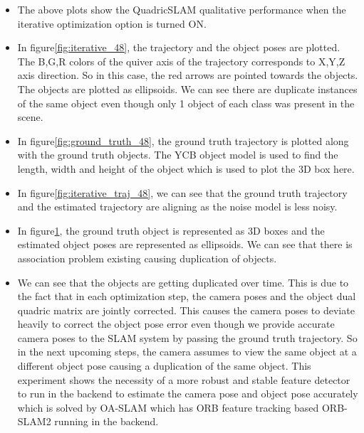 \documentclass[report.tex]{subfiles}
\begin{document}
\begin{itemize}
\begin{figure}[H]
\begin{minipage}{.45\textwidth}
  \label{fig:iterative_obj_48}
\end{minipage}
\end{figure}
\item The above plots show the QuadricSLAM qualitative performance when the iterative optimization option is turned ON.
    \item In figure\ref{fig:iterative_48}, the trajectory and the object poses are plotted. The B,G,R colors of the quiver axis of the trajectory corresponds to X,Y,Z axis direction. So in this case, the red arrows are pointed towards the objects. The objects are plotted as ellipsoids. We can see there are duplicate instances of the same object even though only 1 object of each class was present in the scene.
    \item In figure\ref{fig:ground_truth_48}, the ground truth trajectory is plotted along with the ground truth objects. The YCB object model is used to find the length, width and height of the object which is used to plot the 3D box here.
    \item In figure\ref{fig:iterative_traj_48}, we can see that the ground truth trajectory and the estimated trajectory are aligning as the noise model is less noisy.
    \item In figure\ref{fig:iterative_obj_48}, the ground truth object is represented as 3D boxes and the estimated object poses are represented as ellipsoids. We can see that there is association problem existing causing duplication of objects.
    \item We can see that the objects are getting duplicated over time. This is due to the fact that in each optimization step, the camera poses and the object dual quadric matrix are jointly corrected. This causes the camera poses to deviate heavily to correct the object pose error even though we provide accurate camera poses to the SLAM system by passing the ground truth trajectory. So in the next upcoming steps, the camera assumes to view the same object at a different object pose causing a duplication of the same object. This experiment shows the necessity of a more robust and stable feature detector to run in the backend to estimate the camera pose and object pose accurately which is solved by OA-SLAM which has ORB feature tracking based ORB-SLAM2 running in the backend.
\end{itemize}
\end{document}
